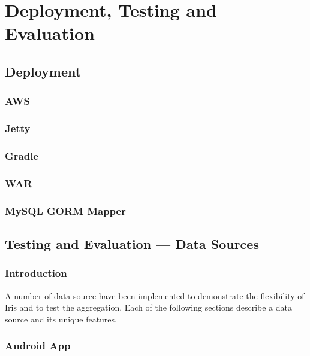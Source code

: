 \documentclass[12pt,a4paper,titlepage]{report}
\begin{document}
\chapter{Deployment, Testing and Evaluation}

\section{Deployment}
\subsection{AWS}
\subsection{Jetty}
\subsection{Gradle}
\subsection{WAR}
\subsection{MySQL GORM Mapper}

\section{Testing and Evaluation --- Data Sources}
\subsection{Introduction}
A number of data source have been implemented to demonstrate the flexibility of Iris and to test the aggregation. Each
of the following sections describe a data source and its unique features.

\subsection{Android App}
\end{document}
